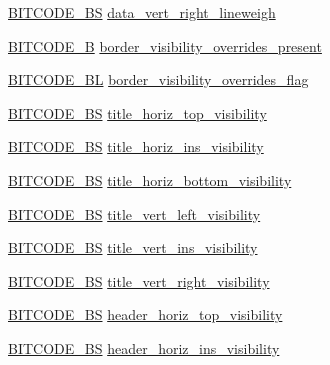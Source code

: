 \begin{DoxyCompactItemize}
\item 
\hyperlink{dwg_8h_a94297606fbd4a4ff97e8add284af0809}{\-B\-I\-T\-C\-O\-D\-E\-\_\-\-B\-S} \hyperlink{struct__dwg__entity__TABLE_a43edb0fbea3043e6cf6ebfbbfeb3e561}{data\-\_\-vert\-\_\-right\-\_\-lineweigh}
\item 
\hyperlink{dwg_8h_ab533b1f62d9086749e3bb5b67e9f224e}{\-B\-I\-T\-C\-O\-D\-E\-\_\-\-B} \hyperlink{struct__dwg__entity__TABLE_aeb5b38466ec424712380ba8e94c9a046}{border\-\_\-visibility\-\_\-overrides\-\_\-present}
\item 
\hyperlink{dwg_8h_aebd5f127038868cbabc3d55d91da776c}{\-B\-I\-T\-C\-O\-D\-E\-\_\-\-B\-L} \hyperlink{struct__dwg__entity__TABLE_a1b22faeeb6cf98fac0c6949ab9b2fff8}{border\-\_\-visibility\-\_\-overrides\-\_\-flag}
\item 
\hyperlink{dwg_8h_a94297606fbd4a4ff97e8add284af0809}{\-B\-I\-T\-C\-O\-D\-E\-\_\-\-B\-S} \hyperlink{struct__dwg__entity__TABLE_ade1567a89a6c7b230bdf7bec816009fd}{title\-\_\-horiz\-\_\-top\-\_\-visibility}
\item 
\hyperlink{dwg_8h_a94297606fbd4a4ff97e8add284af0809}{\-B\-I\-T\-C\-O\-D\-E\-\_\-\-B\-S} \hyperlink{struct__dwg__entity__TABLE_a86730fd6c5e7b5508a1532e1a1eedf0f}{title\-\_\-horiz\-\_\-ins\-\_\-visibility}
\item 
\hyperlink{dwg_8h_a94297606fbd4a4ff97e8add284af0809}{\-B\-I\-T\-C\-O\-D\-E\-\_\-\-B\-S} \hyperlink{struct__dwg__entity__TABLE_a16c2a29380f11ec77dcc4051f9330ddb}{title\-\_\-horiz\-\_\-bottom\-\_\-visibility}
\item 
\hyperlink{dwg_8h_a94297606fbd4a4ff97e8add284af0809}{\-B\-I\-T\-C\-O\-D\-E\-\_\-\-B\-S} \hyperlink{struct__dwg__entity__TABLE_aa3a60ff5f640cc7a6a2a7bfc14758e6f}{title\-\_\-vert\-\_\-left\-\_\-visibility}
\item 
\hyperlink{dwg_8h_a94297606fbd4a4ff97e8add284af0809}{\-B\-I\-T\-C\-O\-D\-E\-\_\-\-B\-S} \hyperlink{struct__dwg__entity__TABLE_a5de7a7a2f787787336ca447ac7461931}{title\-\_\-vert\-\_\-ins\-\_\-visibility}
\item 
\hyperlink{dwg_8h_a94297606fbd4a4ff97e8add284af0809}{\-B\-I\-T\-C\-O\-D\-E\-\_\-\-B\-S} \hyperlink{struct__dwg__entity__TABLE_a571a005190a84e6d136bfd80b98b9a20}{title\-\_\-vert\-\_\-right\-\_\-visibility}
\item 
\hyperlink{dwg_8h_a94297606fbd4a4ff97e8add284af0809}{\-B\-I\-T\-C\-O\-D\-E\-\_\-\-B\-S} \hyperlink{struct__dwg__entity__TABLE_a9ece8010cbbf842bc8151a550d46d2a7}{header\-\_\-horiz\-\_\-top\-\_\-visibility}
\item 
\hyperlink{dwg_8h_a94297606fbd4a4ff97e8add284af0809}{\-B\-I\-T\-C\-O\-D\-E\-\_\-\-B\-S} \hyperlink{struct__dwg__entity__TABLE_a710ad9e86080c148e457cc8e04515ca2}{header\-\_\-horiz\-\_\-ins\-\_\-visibility}

\end{DoxyCompactItemize}

